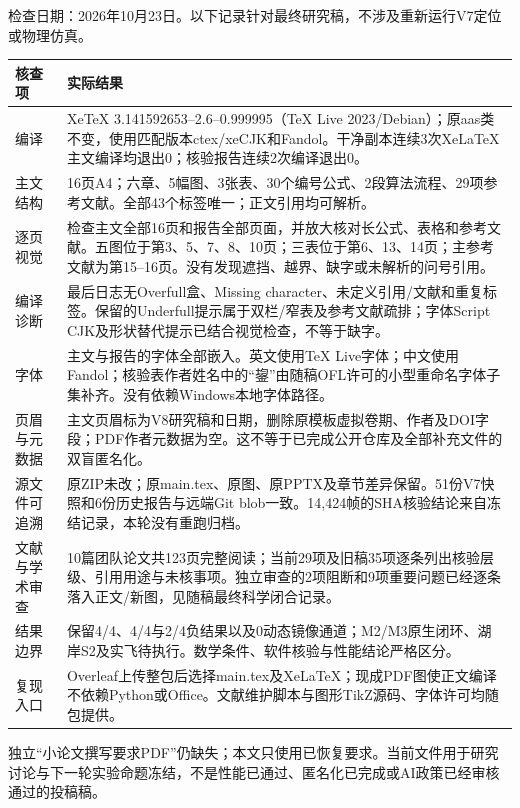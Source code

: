检查日期：2026年10月23日。以下记录针对最终研究稿，不涉及重新运行V7定位或物理仿真。
\begin{longtable}{@{}>{\raggedright\arraybackslash}p{3.0cm}>{\raggedright\arraybackslash}p{12.5cm}@{}}
\toprule 核查项 & 实际结果 \\\midrule\endhead
编译 & XeTeX 3.141592653--2.6--0.999995（TeX Live 2023/Debian）；原aas类不变，使用匹配版本ctex/xeCJK和Fandol。干净副本连续3次XeLaTeX主文编译均退出0；核验报告连续2次编译退出0。\\
主文结构 & 16页A4；六章、5幅图、3张表、30个编号公式、2段算法流程、29项参考文献。全部43个标签唯一；正文引用均可解析。\\
逐页视觉 & 检查主文全部16页和报告全部页面，并放大核对长公式、表格和参考文献。五图位于第3、5、7、8、10页；三表位于第6、13、14页；主参考文献为第15--16页。没有发现遮挡、越界、缺字或未解析的问号引用。\\
编译诊断 & 最后日志无Overfull盒、Missing character、未定义引用/文献和重复标签。保留的Underfull提示属于双栏/窄表及参考文献疏排；字体Script CJK及形状替代提示已结合视觉检查，不等于缺字。\\
字体 & 主文与报告的字体全部嵌入。英文使用TeX Live字体；中文使用Fandol；核验表作者姓名中的“鋆”由随稿OFL许可的小型重命名字体子集补齐。没有依赖Windows本地字体路径。\\
页眉与元数据 & 主文页眉标为V8研究稿和日期，删除原模板虚拟卷期、作者及DOI字段；PDF作者元数据为空。这不等于已完成公开仓库及全部补充文件的双盲匿名化。\\
源文件可追溯 & 原ZIP未改；原main.tex、原图、原PPTX及章节差异保留。51份V7快照和6份历史报告与远端Git blob一致。14,424帧的SHA核验结论来自冻结记录，本轮没有重跑归档。\\
文献与学术审查 & 10篇团队论文共123页完整阅读；当前29项及旧稿35项逐条列出核验层级、引用用途与未核事项。独立审查的2项阻断和9项重要问题已经逐条落入正文/新图，见随稿最终科学闭合记录。\\
结果边界 & 保留4/4、4/4与2/4负结果以及0动态镜像通道；M2/M3原生闭环、湖岸S2及实飞待执行。数学条件、软件核验与性能结论严格区分。\\
复现入口 & Overleaf上传整包后选择main.tex及XeLaTeX；现成PDF图使正文编译不依赖Python或Office。文献维护脚本与图形TikZ源码、字体许可均随包提供。\\
\bottomrule
\end{longtable}
独立“小论文撰写要求PDF”仍缺失；本文只使用已恢复要求。当前文件用于研究讨论与下一轮实验命题冻结，不是性能已通过、匿名化已完成或AI政策已经审核通过的投稿稿。
